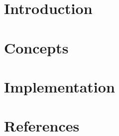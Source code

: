 \section[Intro]{Introduction}



\section[Con]{Concepts}



\section[Impl]{Implementation}


\section[Refs]{References}
